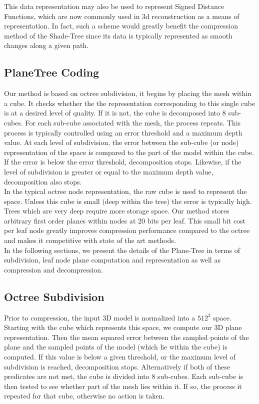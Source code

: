 This data representation may also be used to represent Signed Distance Functions, which are now commonly used in 3d reconstruction as a means of representation. In fact, such a scheme would greatly benefit the compression method of the Shade-Tree since its data is typically represented as smooth changes along a given path. 

\subsection{PlaneTree Coding}

Our method is based on octree subdivision, it begins by placing the mesh within a cube. It checks whether the the representation corresponding to this single cube is at a desired level of quality. If it is not, the cube is decomposed into 8 sub-cubes. For each sub-cube associated with the mesh, the process repeats. This process is typically controlled using an error threshold and a maximum depth value. At each level of subdivision, the error between the sub-cube (or node) representation of the space is compared to the part of the model within the cube. If the error is below the error threshold, decomposition stops. Likewise, if the level of subdivision is greater or equal to the maximum depth value, decomposition also stops. \\

In the typical octree node representation, the raw cube is used to represent the space. Unless this cube is small (deep within the tree) the error is typically high. Trees which are very deep require more storage space. Our method stores arbitrary first order planes within nodes at 20 bits per leaf. This small bit cost per leaf node greatly improves compression performance compared to the octree and makes it competitive with state of the art methods. \\

 
In the following sections, we present the details of the Plane-Tree in terms of subdivision, leaf node plane computation and representation as well as compression and decompression.


\subsection{Octree Subdivision}

Prior to compression, the input 3D model is normalized into a $512^3$ space. Starting with the cube which represents this space, we compute our 3D plane representation. Then the mean squared error between the sampled points of the plane and the sampled points of the model (which lie within the cube) is computed. If this value is below a given threshold, or the maximum level of subdivision is reached, decomposition stops. Alternatively if both of these predicates are not met, the cube is divided into 8 sub-cubes. Each sub-cube is then tested to see whether part of the mesh lies within it. If so, the process it repeated for that cube, otherwise no action is taken. \\

